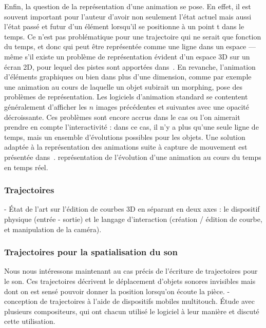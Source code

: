 \documentclass[french,12pt]{article}
\begin{document}
Enfin, la question de la représentation d'une animation se pose. En effet, il est souvent important pour l'auteur d'avoir non seulement l'état actuel mais aussi l'état passé et futur d'un élément lorsqu'il se positionne à un point t dans le temps. 
Ce n'est pas problématique pour une trajectoire qui ne serait que fonction du temps, et donc qui peut être représentée comme une ligne dans un espace --- même s'il existe un problème de représentation évident d'un espace 3D sur un écran 2D, pour lequel des pistes sont apportées dans~\cite{cohen_interface_1999}.
En revanche, l'animation d'éléments graphiques ou bien dans plus d'une dimension, comme par exemple une animation au cours de laquelle un objet subirait un morphing, pose des problèmes de représentation. Les logiciels d'animation standard se contentent généralement d'afficher les $n$ images précédentes et suivantes avec une opacité décroissante. Ces problèmes sont encore accrus dans le cas ou l'on aimerait prendre en compte l'interactivité : dans ce cas, il n'y a plus qu'une seule ligne de temps, mais un ensemble d'évolutions possibles pour les objets. 
Une solution adaptée à la représentation des animations suite à capture de mouvement est présentée dans~\cite{casas_4d_2013}. représentation de l'évolution d'une animation au cours du temps en temps réel. 

\subsubsection{Trajectoires}
- État de l'art sur l'édition de courbes 3D en séparant en deux axes : le dispositif physique (entrée - sortie) et le langage d'interaction (création / édition de courbe, et manipulation de la caméra).
\cite{jacob_design_2014} %


\subsubsection{Trajectoires pour la spatialisation du son}
Nous nous intéressons maintenant au cas précis de l'écriture de trajectoires pour le son. Ces trajectoires décrivent le déplacement d'objets sonores invisibles mais dont on est sensé pouvoir donner la position lorsqu'on écoute la pièce.
- conception de trajectoires à l'aide de dispositifs mobiles multitouch. Étude avec plusieurs compositeurs, qui ont chacun utilisé le logiciel à leur manière et discuté cette utilisation.
\cite{favory_trajectoires:_2015}

\cite{garcia_jeremie_processing_2015,garcia_towards_2015} %
\end{document}
